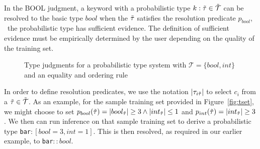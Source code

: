 In the {\scriptsize BOOL} judgment, a keyword with a probabilistic type $k : \tilde{\tau} \in \tilde{\mathcal{T}}$ can be resolved to the basic type $bool$ when the $\tilde{\tau}$ satisfies the resolution predicate $p_{bool}$, \ie\ the probabilistic type has sufficient evidence.
The definition of sufficient evidence must be empirically determined by the user depending on the quality of the training set.

{
\setlength{\abovecaptionskip}{-.05pt}
\setlength{\belowcaptionskip}{-15pt}
\begin{figure}
\caption{Type judgments for a probabilistic type system with $\mathcal{T} = \{bool,int\}$ and an equality and ordering rule}
\label{fig:ptypes}
\end{figure}
}

In order to define resolution predicates, we use the notation $|\tau_{i\tilde{\tau}}|$ to select $c_i$ from a $\tilde{\tau} \in \tilde{\mathcal{T}}$.
As an example, for the sample training set provided in Figure~\ref{fig:tset}, we might choose to set $p_{bool}(\tilde{\tau})= |bool_{\tilde{\tau}}| \geq 3 \land |int_{\tilde{\tau}}| \leq 1$ and $p_{int}(\tilde{\tau})= |int_{\tilde{\tau}}| \geq 3$.
We then can run inference on that sample training set to derive a probabilistic type \texttt{bar}$:[bool=3,int=1]$.
This is then resolved, as required in our earlier example, to \texttt{bar}$::bool$.
 
